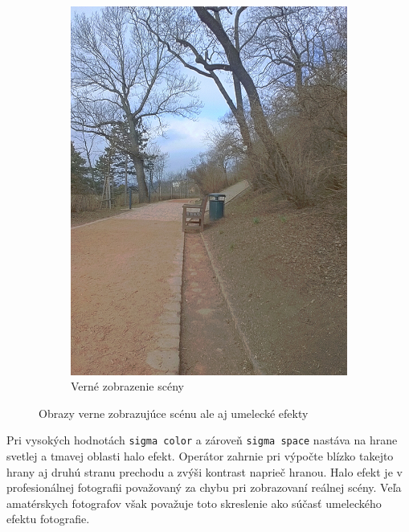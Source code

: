 \begin{figure}[h!]
\begin{subfigure}{0.3\textwidth}
      \includegraphics[width=\textwidth]{figures/tests/tmo/durVerna2}
      \caption{Verné zobrazenie scény}
  \end{subfigure}
  \caption{Obrazy verne zobrazujúce scénu ale aj umelecké efekty}
  \label{fig:durandUsage}
\end{figure}

Pri vysokých hodnotách \texttt{sigma color} a zároveň \texttt{sigma space} nastáva na hrane svetlej a tmavej oblasti halo efekt.
Operátor zahrnie pri výpočte blízko takejto hrany aj druhú stranu prechodu a zvýši kontrast naprieč hranou. Halo efekt je v
profesionálnej fotografii považovaný za chybu pri zobrazovaní reálnej scény. Veľa amatérskych fotografov však považuje toto
skreslenie ako súčasť umeleckého efektu fotografie.

